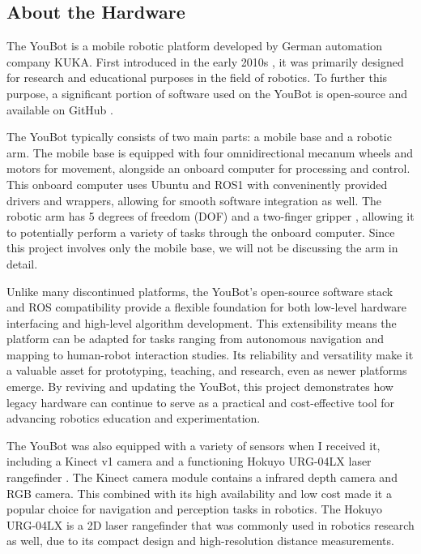 \documentclass[a4paper, 12pt]{article}
\newif\ifshownotes
\newcommand{\notes}[1]{\ifshownotes\textcolor{blue}{#1}\fi}
\begin{document}
    \subsection{About the Hardware}

    The YouBot is a mobile robotic platform developed by German automation company KUKA. First introduced in the early 2010s \notes{[cite]}, it was primarily designed for research and educational purposes in the field of robotics. To further this purpose, a significant portion of software used on the YouBot is open-source and available on GitHub \notes{[cite]}. 

    The YouBot typically consists of two main parts: a mobile base and a robotic arm. The mobile base is equipped with four omnidirectional mecanum wheels and motors for movement, alongside an onboard computer for processing and control. This onboard computer uses Ubuntu and ROS1 with conveninently provided drivers and wrappers, allowing for smooth software integration as well. The robotic arm has 5 degrees of freedom (DOF) and a two-finger gripper \notes{[cite]}, allowing it to potentially perform a variety of tasks through the onboard computer. Since this  project involves only the mobile base, we will not be discussing the arm in detail.

    Unlike many discontinued platforms, the YouBot's open-source software stack and ROS compatibility provide a flexible foundation for both low-level hardware interfacing and high-level algorithm development. This extensibility means the platform can be adapted for tasks ranging from autonomous navigation and mapping to human-robot interaction studies. Its reliability and versatility make it a valuable asset for prototyping, teaching, and research, even as newer platforms emerge. By reviving and updating the YouBot, this project demonstrates how legacy hardware can continue to serve as a practical and cost-effective tool for advancing robotics education and experimentation.

    The YouBot was also equipped with a variety of sensors when I received it, including a Kinect v1 camera \notes{[cite]} and a functioning Hokuyo URG-04LX laser rangefinder \notes{[cite]}. The Kinect camera module contains a infrared depth camera and RGB camera. This combined with its high availability and low cost made it a popular choice for navigation and perception tasks in robotics. The Hokuyo URG-04LX is a 2D laser rangefinder that was commonly used in robotics research as well, due to its compact design and high-resolution distance measurements. 
\end{document}
